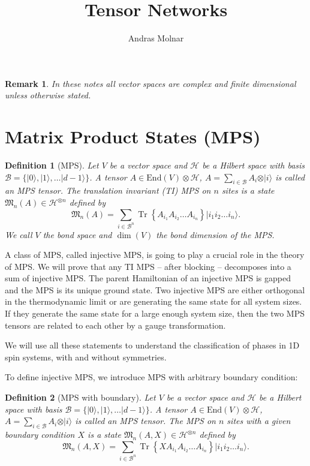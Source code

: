\documentclass{article}
\title{Tensor Networks}
\author{Andras Molnar}
\newtheorem{remark}{Remark}
\newtheorem{definition}{Definition}
\newcommand{\tr}{\operatorname{Tr}}
\newcommand{\End}{\mathrm{End}}
\newcommand{\ket}[1]{\vert #1 \rangle}
\begin{document}
\maketitle

\begin{remark}
	In these notes all vector spaces are complex and finite dimensional unless otherwise stated.
\end{remark}


\section{Matrix Product States (MPS)}

\begin{definition}[MPS]
  Let $V$ be a vector space and $\mathcal{H}$ be a Hilbert space with basis $\mathcal{B} = \{\ket{0},\ket{1},\dots \ket{d-1}\}$. A tensor $A\in \End(V)\otimes \mathcal{H}$, $A = \sum_{i\in \mathcal{B}} A_i \otimes \ket{i}$ is called an MPS tensor. The translation invariant (TI) MPS on $n$ sites is a state $\mathfrak{M}_n(A)\in \mathcal{H}^{\otimes n}$ defined by
  \begin{equation*}
  	\mathfrak{M}_n(A) = \sum_{i\in \mathcal{B}^n} \tr\left\{A_{i_1} A_{i_2} \dots A_{i_n}\right\} \ket{i_1 i_2 \dots i_n}.
  \end{equation*}
  We call $V$ the bond space and $\dim(V)$ the bond dimension of the MPS.
\end{definition}

A class of MPS, called injective MPS, is going to play a crucial role in the theory of MPS. We will prove that any TI MPS -- after blocking -- decomposes into a sum of injective MPS. The parent Hamiltonian of an injective MPS is gapped and the MPS is its unique ground state. Two injective MPS are either orthogonal in the thermodynamic limit or are generating the same state for all system sizes. If they generate the same state for a large enough system size, then the two MPS tensors are related to each other by a gauge transformation. 

We will use all these statements to understand the classification of phases in 1D spin systems, with and without symmetries. 

To define injective MPS, we introduce MPS with arbitrary boundary condition:
\begin{definition}[MPS with boundary]
  Let $V$ be a vector space and $\mathcal{H}$ be a Hilbert space with basis $\mathcal{B} = \{\ket{0},\ket{1},\dots \ket{d-1}\}$. A tensor $A\in \End(V)\otimes \mathcal{H}$, $A = \sum_{i\in \mathcal{B}} A_i \otimes \ket{i}$ is called an MPS tensor. The MPS on $n$ sites with a given boundary condition $X$ is a state $\mathfrak{M}_n(A,X)\in \mathcal{H}^{\otimes n}$ defined by
  \begin{equation*}
    \mathfrak{M}_n(A,X) = \sum_{i\in \mathcal{B}^n} \tr\left\{XA_{i_1} A_{i_2} \dots A_{i_n}\right\} \ket{i_1 i_2 \dots i_n}.
  \end{equation*}
\end{definition}
\end{document}
